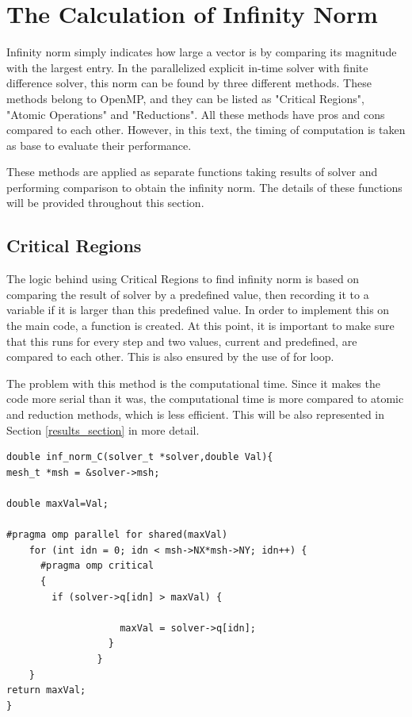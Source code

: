 \documentclass{article}
\begin{document}
\section{The Calculation of Infinity Norm }
\label{Inf_section}
Infinity norm simply indicates how large a vector is by comparing its magnitude with the largest entry. In the parallelized explicit in-time solver with finite difference solver, this norm can be found by three different methods. These methods belong to OpenMP, and they can be listed as "Critical Regions", "Atomic Operations" and "Reductions". All these methods have pros and cons compared to each other. However, in this text, the timing of computation is taken as base to evaluate their performance. 

These methods are applied as separate functions taking results of solver and performing comparison to obtain the infinity norm. The details of these functions will be provided throughout this section. 

\subsection{Critical Regions}
The logic behind using Critical Regions to find infinity norm is based on comparing the result of solver by a predefined value, then recording it to a variable if it is larger than this predefined value. In order to implement this on the main code, a function is created. At this point, it is important to make sure that this runs for every step and two values, current and predefined, are compared to each other. This is also ensured by the use of for loop.  

The problem with this method is the computational time. Since it makes the code more serial than it was, the computational time is more compared to atomic and reduction methods, which is less efficient. This will be also represented in Section \ref{results_section} in more detail. 
\begin{verbatim}
double inf_norm_C(solver_t *solver,double Val){
mesh_t *msh = &solver->msh;

double maxVal=Val;

#pragma omp parallel for shared(maxVal)
    for (int idn = 0; idn < msh->NX*msh->NY; idn++) {
      #pragma omp critical
      {
        if (solver->q[idn] > maxVal) {
          
                    maxVal = solver->q[idn];
                  }
                }
    }
return maxVal;
}
\end{verbatim}
\end{document}
